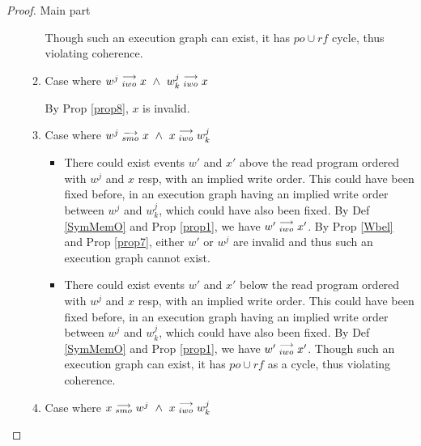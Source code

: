 \begin{proof}{Main part}
\begin{itemize}
\begin{enumerate}
                                Though such an execution graph can exist, it has $po \cup rf$ cycle, thus violating coherence.
                            
                            \item Case where $w^j\stackrel{\longrightarrow}{_{iwo}}x \ \wedge \ w_k^j\stackrel{\longrightarrow}{_{iwo}}x$
                        
                                By Prop \ref{prop8}, $x$ is invalid. 
                            
                            \item Case where $w^j\stackrel{\longrightarrow}{_{smo}}x \ \wedge \ x\stackrel{\longrightarrow}{_{iwo}}w_k^j$
                                
                                \begin{itemize}
                                    
                                    \item There could exist events $w'$ and $x'$ above the read program ordered with $w^j$ and $x$ resp, with an implied write order. This could have been fixed before, in an execution graph having an implied write order between $w^j$ and $w_k^j$, which could have also been fixed.
                                    By Def \ref{SymMemO} and Prop \ref{prop1}, we have $w'\stackrel{\longrightarrow}{_{iwo}}x'$.
                                    By Prop \ref{Wbel} and Prop \ref{prop7}, either $w'$ or $w^j$ are invalid and thus such an execution graph cannot exist. 

                                    \item There could exist events $w'$ and $x'$ below the read program ordered with $w^j$ and $x$ resp, with an implied write order. This could have been fixed before, in an execution graph having an implied write order between $w^j$ and $w_k^j$, which could have also been fixed.
                                    By Def \ref{SymMemO} and Prop \ref{prop1}, we have $w'\stackrel{\longrightarrow}{_{iwo}}x'$.
                                    Though such an execution graph can exist, it has $po \cup rf$ as a cycle, thus violating coherence. 

                                \end{itemize}

                            \item Case where $x\stackrel{\longrightarrow}{_{smo}}w^j \ \wedge \ x\stackrel{\longrightarrow}{_{iwo}}w_k^j$
                               
                                \begin{itemize}


\end{itemize}
\end{enumerate}
\end{itemize}
\end{proof}
